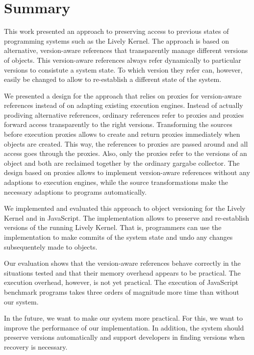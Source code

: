 \chapter{Summary} \label{chapter:SUMMARY}

This work presented an approach to preserving access to previous states of programming systems such as the Lively Kernel.
The approach is based on alternative, version-aware references that transparently manage different versions of objects.
This version-aware references always refer dynamically to particular versions to consistute a system state.
To which version they refer can, however, easily be changed to allow to re-establish a different state of the system.

We presented a design for the approach that relies on proxies for version-aware references instead of on adapting existing execution engines.
Instead of actually prodiving alternative references, ordinary references refer to proxies and proxies forward access transparently to the right versions.
Transforming the sources before execution proxies allows to create and return proxies immediately when objects are created. 
This way, the references to proxies are passed around and all access goes through the proxies.
Also, only the proxies refer to the versions of an object and both are reclaimed together by the ordinary gargabe collector.
The design based on proxies allows to implement version-aware references without any adaptions to execution engines, while the source transformations make the necessary adaptions to programs automatically.

We implemented and evaluated this approach to object versioning for the Lively Kernel and in JavaScript.
The implementation allows to preserve and re-establish versions of the running Lively Kernel.
That is, programmers can use the implementation to make commits of the system state and undo any changes subsequentely made to objects.

Our evaluation shows that the version-aware references behave correctly in the situations tested and that their memory overhead appears to be practical. The execution overhead, however, is not yet practical.
The execution of JavaScript benchmark programs takes three orders of magnitude more time than without our system.

In the future, we want to make our system more practical.
For this, we want to improve the performance of our implementation.
In addition, the system should preserve versions automatically and support developers in finding versions when recovery is necessary.

